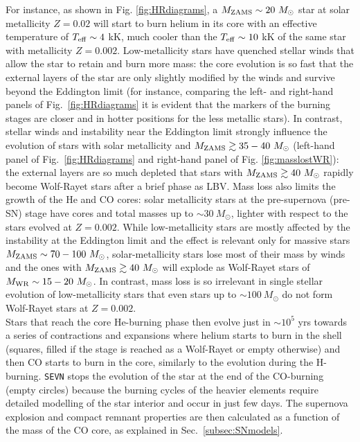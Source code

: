 \documentclass[a4paper,titlepage]{book}     	%
\newcommand{\sun}{\ensuremath{_\odot}}
\newcommand{\mzams}{M_\textup{ZAMS}}
\newcommand{\msun}{\ensuremath{M\sun}}
\begin{document}
For instance, as shown in Fig. \ref{fig:HRdiagrams}, a $\mzams \sim 20~\msun$ star at solar metallicity $Z=0.02$ will start to burn helium in its core with an effective temperature of $T_{\rm eff} \sim 4$ kK, much cooler than the $T_{\rm eff} \sim 10$ kK of the same star with metallicity $Z=0.002$. Low-metallicity stars have quenched stellar winds that allow the star to retain and burn more mass: the core evolution is so fast that the external layers of the star are only slightly modified by the winds and survive beyond the Eddington limit (for instance, comparing the left- and right-hand panels of Fig.\ \ref{fig:HRdiagrams} it is evident that the markers of the burning stages are closer and in hotter positions for the less metallic stars). In contrast, stellar winds and instability near the Eddington limit strongly influence the evolution of stars with solar metallicity and $\mzams \gtrsim 35-40~\msun$ (left-hand panel of Fig.\ \ref{fig:HRdiagrams} and right-hand panel of Fig. \ref{fig:masslostWR}): the external layers are so much depleted that stars with $\mzams \gtrsim 40~\msun$ rapidly become Wolf-Rayet stars after a brief phase as LBV. Mass loss also limits the growth of the He and CO cores: solar metallicity stars at the pre-supernova (pre-SN) stage have cores and total masses up to $\sim 30~\msun$, lighter with respect to the stars evolved at $Z=0.002$. While low-metallicity stars are mostly affected by the instability at the Eddington limit and the effect is relevant only for massive stars $\mzams \sim 70-100~\msun$, solar-metallicity stars lose most of their mass by winds and the ones with $\mzams \gtrsim 40~\msun$ will explode as Wolf-Rayet stars of $M_{\rm WR} \sim 15-20~\msun$. In contrast, mass loss is so irrelevant in single stellar evolution of low-metallicity stars that even stars up to $\sim 100~\msun$ do not form Wolf-Rayet stars at $Z=0.002$.\\

Stars that reach the core He-burning phase then evolve just in $\sim 10^{5}$ yrs towards a series of contractions and expansions where helium starts to burn in the shell (squares, filled if the stage is reached as a Wolf-Rayet or empty otherwise) and then CO starts to burn in the core, similarly to the evolution during the H-burning. \texttt{SEVN} stops the evolution of the star at the end of the CO-burning (empty circles) because the burning cycles of the heavier elements require detailed modelling of the star interior and occur in just few days. The supernova explosion and compact remnant properties are then calculated as a function of the mass of the CO core, as explained in Sec.\ \ref{subsec:SNmodels}.
\end{document}
